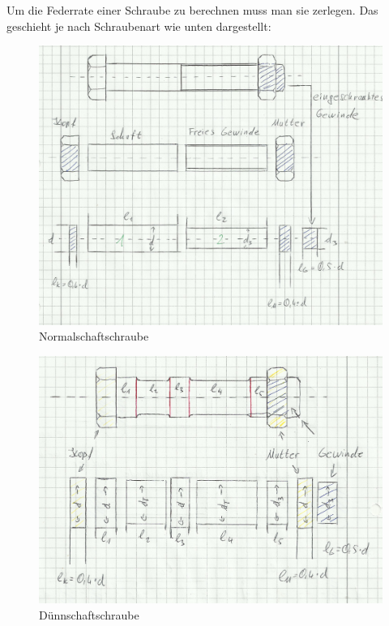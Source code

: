 Um die Federrate einer Schraube zu berechnen muss man sie zerlegen. Das geschieht je nach Schraubenart wie unten dargestellt:
\begin{figure}[h]
\centering
\includegraphics[scale=0.5]{schrauben/Federrate_Schrauben_1.png}
\caption{Normalschaftschraube}
\end{figure}
\begin{figure}[h]
\centering
\includegraphics[scale=0.45]{schrauben/Federrate_Schrauben_2.png}
\caption{Dünnschaftschraube}
\end{figure}

\newpage

